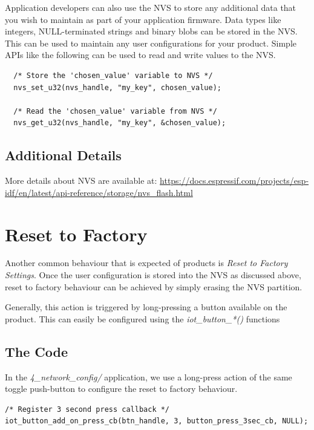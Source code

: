 \documentclass[main.tex]{subfiles}
\begin{document}
Application developers can also use the NVS to store any additional data that you wish to maintain as part of your application firmware. Data types like integers, NULL-terminated strings and binary blobs can be stored in the NVS. This can be used to maintain any user configurations for your product. Simple APIs like the following can be used to read and write values to the NVS.

\begin{verbatim}
  /* Store the 'chosen_value' variable to NVS */
  nvs_set_u32(nvs_handle, "my_key", chosen_value);

  /* Read the 'chosen_value' variable from NVS */
  nvs_get_u32(nvs_handle, "my_key", &chosen_value);
\end{verbatim}


\subsection{Additional Details}

More details about NVS are available at: \url{https://docs.espressif.com/projects/esp-idf/en/latest/api-reference/storage/nvs_flash.html}

\section{Reset to Factory}
Another common behaviour that is expected of products is \textit{Reset to Factory Settings}. Once the user configuration is stored into the NVS as discussed above, reset to factory behaviour can be achieved by simply erasing the NVS partition.

Generally, this action is triggered by long-pressing a button available on the product. This can easily be configured using the \textit{iot\_button\_*()} functions

\subsection{The Code}\label{sec:reset_to_factory}
In the \textit{4\_network\_config/} application, we use a long-press action of the same toggle push-button to configure the reset to factory behaviour.

\begin{verbatim}
/* Register 3 second press callback */  
iot_button_add_on_press_cb(btn_handle, 3, button_press_3sec_cb, NULL);
\end{verbatim}
\end{document}
